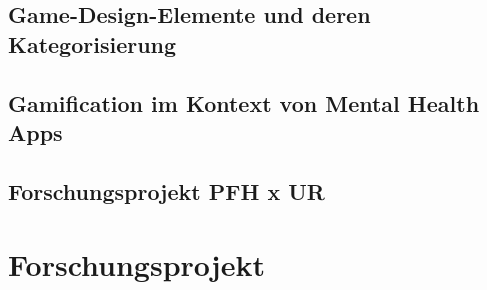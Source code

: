 \subsection{Game-Design-Elemente und deren Kategorisierung}\label{subsubsec:game_design_elemente}

\subsection{Gamification im Kontext von Mental Health Apps}\label{subsubsec:gamification_in_mental_health_apps}

\subsection{Forschungsprojekt PFH x UR}\label{subsubsec:forschungsproject}



\section{Forschungsprojekt}\label{subsec:forschungsprojekt}



